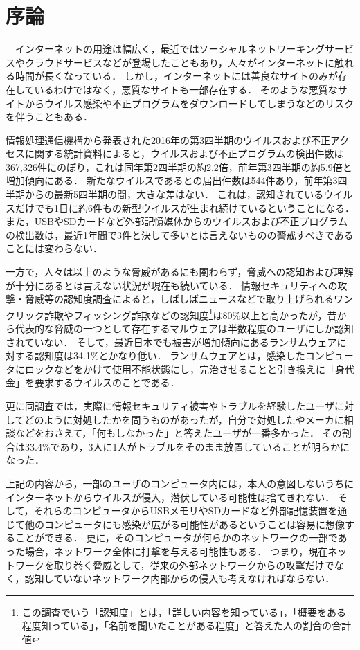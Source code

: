 \chapter{序論}

　インターネットの用途は幅広く，最近ではソーシャルネットワーキングサービスやクラウドサービスなどが登場したこともあり，人々がインターネットに触れる時間が長くなっている．
しかし，インターネットには善良なサイトのみが存在しているわけではなく，悪質なサイトも一部存在する．
そのような悪質なサイトからウイルス感染や不正プログラムをダウンロードしてしまうなどのリスクを伴うこともある．

情報処理通信機構から発表された2016年の第3四半期のウイルスおよび不正アクセスに関する統計資料\cite{joron2}によると，ウイルスおよび不正プログラムの検出件数は367,326件にのぼり，これは同年第2四半期の約2.2倍，前年第3四半期の約5.9倍と増加傾向にある．
新たなウイルスであるとの届出件数は544件あり，前年第3四半期からの最新5四半期の間，大きな差はない．
これは，認知されているウイルスだけでも1日に約6件もの新型ウイルスが生まれ続けているということになる．
また，USBやSDカードなど外部記憶媒体からのウイルスおよび不正プログラムの検出数は，最近1年間で3件と決して多いとは言えないものの警戒すべきであることには変わらない．

一方で，人々は以上のような脅威があるにも関わらず，脅威への認知および理解が十分にあるとは言えない状況が現在も続いている．
情報セキュリティへの攻撃・脅威等の認知度調査\cite{joron1}によると，しばしばニュースなどで取り上げられるワンクリック詐欺やフィッシング詐欺などの認知度\footnote{この調査でいう「認知度」とは，「詳しい内容を知っている」，「概要をある程度知っている」，「名前を聞いたことがある程度」と答えた人の割合の合計値}は80\%以上と高かったが，昔から代表的な脅威の一つとして存在するマルウェアは半数程度のユーザにしか認知されていない．
そして，最近日本でも被害が増加傾向にあるランサムウェア\cite{ransomware}に対する認知度は34.1\%とかなり低い．
ランサムウェアとは，感染したコンピュータにロックなどをかけて使用不能状態にし，完治させることと引き換えに「身代金」を要求するウイルスのことである．

更に同調査では，実際に情報セキュリティ被害やトラブルを経験したユーザに対してどのように対処したかを問うものがあったが，自分で対処したやメーカに相談などをおさえて，「何もしなかった」と答えたユーザが一番多かった．
その割合は33.4\%であり，3人に1人がトラブルをそのまま放置していることが明らかになった．

上記の内容から，一部のユーザのコンピュータ内には，本人の意図しないうちにインターネットからウイルスが侵入，潜伏している可能性は捨てきれない．
そして，それらのコンピュータからUSBメモリやSDカードなど外部記憶装置を通じて他のコンピュータにも感染が広がる可能性があるということは容易に想像することができる．
更に，そのコンピュータが何らかのネットワークの一部であった場合，ネットワーク全体に打撃を与える可能性もある．
つまり，現在ネットワークを取り巻く脅威として，従来の外部ネットワークからの攻撃だけでなく，認知していないネットワーク内部からの侵入も考えなければならない．

